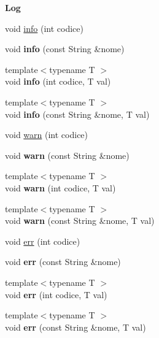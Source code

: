 \begin{Indent}\textbf{ Log}\par
\begin{DoxyCompactItemize}
\item 
void \hyperlink{class_debug_a9e8eec71718abfd7cca293c81bbd3409}{info} (int codice)
\item 
\mbox{\label{class_debug_abc3c2e45e0c054c76e52b9ed96197a7e}} 
void {\bfseries info} (const String \&nome)
\item 
\mbox{\label{class_debug_a7270f6fdf27db238ff0b02038550ec2f}} 
{\footnotesize template$<$typename T $>$ }\\void {\bfseries info} (int codice, T val)
\item 
\mbox{\label{class_debug_a501d2501d69379da2a8b98eddd1d0c07}} 
{\footnotesize template$<$typename T $>$ }\\void {\bfseries info} (const String \&nome, T val)
\item 
void \hyperlink{class_debug_a1874722488c45685e073fc564c853901}{warn} (int codice)
\item 
\mbox{\label{class_debug_a31d43147005492ffc977e5dcb9fbc1c7}} 
void {\bfseries warn} (const String \&nome)
\item 
\mbox{\label{class_debug_a62c0fbef59b6d9316968cd7e265672c3}} 
{\footnotesize template$<$typename T $>$ }\\void {\bfseries warn} (int codice, T val)
\item 
\mbox{\label{class_debug_a8541c08e9881f1c87ae99c54dcc9f52e}} 
{\footnotesize template$<$typename T $>$ }\\void {\bfseries warn} (const String \&nome, T val)
\item 
void \hyperlink{class_debug_a8937e0f08ba09157f0d6660b2a0a02f1}{err} (int codice)
\item 
\mbox{\label{class_debug_ac79a9cc7d7acd0a58c0fe94901fa613c}} 
void {\bfseries err} (const String \&nome)
\item 
\mbox{\label{class_debug_a50e33c2fe2f086ffa662d58654d1ab78}} 
{\footnotesize template$<$typename T $>$ }\\void {\bfseries err} (int codice, T val)
\item 
\mbox{\label{class_debug_a332f53388bd11eb25f29ede14e886c04}} 
{\footnotesize template$<$typename T $>$ }\\void {\bfseries err} (const String \&nome, T val)
\end{DoxyCompactItemize}
\end{Indent}
